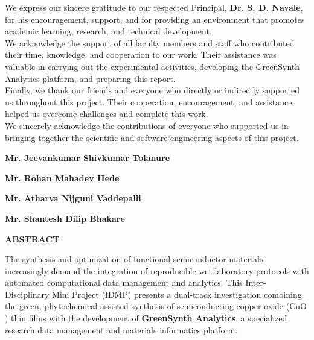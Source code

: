 \documentclass[12pt,a4paper,oneside]{report}
\begin{document}
{{{We express our sincere gratitude to our respected Principal, \textbf{Dr. S. D. Navale}, for his encouragement, support, and for providing an environment that promotes academic learning, research, and technical development.\\

We acknowledge the support of all faculty members and staff who contributed their time, knowledge, and cooperation to our work. Their assistance was valuable in carrying out the experimental activities, developing the GreenSynth Analytics platform, and preparing this report.\\

Finally, we thank our friends and everyone who directly or indirectly supported us throughout this project. Their cooperation, encouragement, and assistance helped us overcome challenges and complete this work.\\
\newpage
We sincerely acknowledge the contributions of everyone who supported us in bringing together the scientific and software engineering aspects of this project.

\vspace{1.5cm}
\begin{flushright}
{\textbf{Mr. Jeevankumar Shivkumar Tolanure}}
\end{flushright}
\vspace{0.1cm}
\begin{flushright}
{\textbf{Mr. Rohan Mahadev Hede}}
\end{flushright}
\vspace{0.1cm}
\begin{flushright}
{\textbf{Mr. Atharva Nijguni Vaddepalli}}
\end{flushright}
\vspace{0.1cm}
\begin{flushright}
{\textbf{Mr. Shantesh Dilip Bhakare}}
\end{flushright}



\newpage
\begin{center}
{\large{\textbf{ABSTRACT}}}
\end{center}

\vspace*{1cm}

The synthesis and optimization of functional semiconductor materials increasingly demand the integration of reproducible wet-laboratory protocols with automated computational data management and analytics. This Inter-Disciplinary Mini Project (IDMP) presents a dual-track investigation combining the green, phytochemical-assisted synthesis of semiconducting copper oxide ($\text{CuO}$) thin films with the development of \textbf{GreenSynth Analytics}, a specialized research data management and materials informatics platform.

}}}
\end{document}
